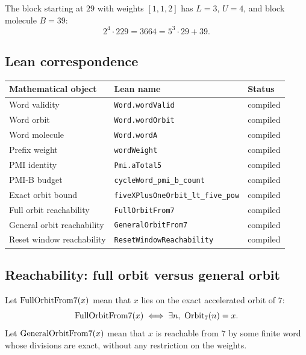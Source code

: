 \begin{example}\label{ex:block}
The block starting at $29$ with weights $[1,1,2]$ has
$L=3$, $U=4$, and block molecule $B=39$:
\begin{equation*}
  2^4\cdot229=3664=5^3\cdot29+39.
\end{equation*}
\end{example}

\subsection{Lean correspondence}

\begin{center}
\begin{tabular}{lll}
\toprule
Mathematical object & Lean name & Status \\
\midrule
Word validity & \texttt{Word.wordValid} & compiled \\
Word orbit & \texttt{Word.wordOrbit} & compiled \\
Word molecule & \texttt{Word.wordA} & compiled \\
Prefix weight & \texttt{wordWeight} & compiled \\
PMI identity & \texttt{Pmi.aTotal5} & compiled \\
PMI-B budget & \texttt{cycleWord\_pmi\_b\_count} & compiled \\
Exact orbit bound & \texttt{fiveXPlusOneOrbit\_lt\_five\_pow} & compiled \\
Full orbit reachability & \texttt{FullOrbitFrom7} & compiled \\
General orbit reachability & \texttt{GeneralOrbitFrom7} & compiled \\
Reset window reachability & \texttt{ResetWindowReachability} & compiled \\
\bottomrule
\end{tabular}
\end{center}

\subsection{Reachability: full orbit versus general orbit}

\begin{definition}\label{def:reach}
Let $\mathrm{FullOrbitFrom7}(x)$ mean that $x$ lies on the exact accelerated orbit
of $7$:
\begin{equation*}
  \FullOrbit(x)\iff \exists n,\ \Orbit_7(n)=x.
\end{equation*}
Let $\mathrm{GeneralOrbitFrom7}(x)$ mean that $x$ is reachable from $7$ by some
finite word whose divisions are exact, without any restriction on the
weights.
\end{definition}

